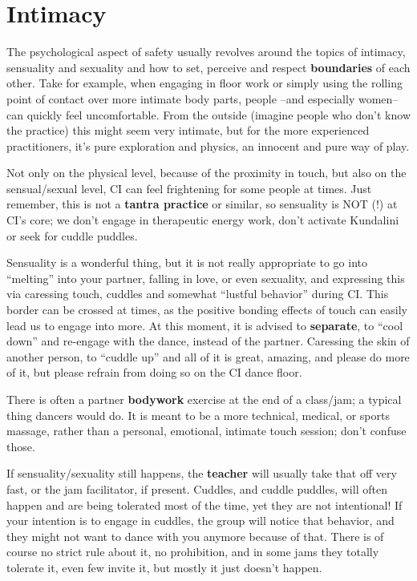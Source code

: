 \section{Intimacy}\label{sec:intimacy}

The psychological aspect of safety usually revolves around the topics of intimacy, sensuality and sexuality and how to set, perceive and respect \textbf{boundaries} of each other.
Take for example, when engaging in floor work or simply using the rolling point of contact over more intimate body parts, people --and especially women-- can quickly feel uncomfortable.
From the outside (imagine people who don't know the practice) this might seem very intimate, but for the more experienced practitioners, it's pure exploration and physics, an innocent and pure way of play.

Not only on the physical level, because of the proximity in touch, but also on the sensual/sexual level, CI can feel frightening for some people at times.
Just remember, this is not a \textbf{tantra practice} or similar, so sensuality is NOT (!) at CI's core; we don't engage in therapeutic energy work, don't activate Kundalini or seek for cuddle puddles.

Sensuality is a wonderful thing, but it is not really appropriate to go into ``melting'' into your partner, falling in love, or even sexuality, and expressing this via caressing touch, cuddles and somewhat ``lustful behavior'' during CI\@.
This border can be crossed at times, as the positive bonding effects of touch can easily lead us to engage into more.
At this moment, it is advised to \textbf{separate}, to ``cool down'' and re-engage with the dance, instead of the partner.
Caressing the skin of another person, to ``cuddle up'' and all of it is great, amazing, and please do more of it, but please refrain from doing so on the CI dance floor.

There is often a partner \textbf{bodywork} exercise at the end of a class/jam; a typical thing dancers would do.
It is meant to be a more technical, medical, or sports massage, rather than a personal, emotional, intimate touch session; don't confuse those.

If sensuality/sexuality still happens, the \textbf{teacher} will usually take that off very fast, or the jam facilitator, if present.
Cuddles, and cuddle puddles, will often happen and are being tolerated most of the time, yet they are not intentional!
If your intention is to engage in cuddles, the group will notice that behavior, and they might not want to dance with you anymore because of that.
There is of course no strict rule about it, no prohibition, and in some jams they totally tolerate it, even few invite it, but mostly it just doesn't happen.

